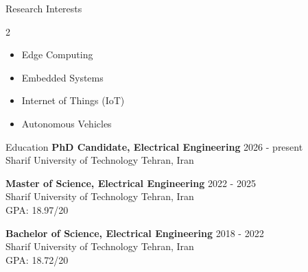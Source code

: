 \documentclass{resume} %
\begin{document}
\begin{rSection}{Research Interests}
\vspace*{-7pt}
\begin{multicols}{2}
\begin{itemize}
    \itemsep -3pt {} 
    \item Edge Computing
    \item Embedded Systems
    \item Internet of Things (IoT)
    \item Autonomous Vehicles
\end{itemize}
\end{multicols}
\vspace*{-12pt}
\end{rSection}

\begin{rSection}{Education}
{\bf PhD Candidate, Electrical Engineering} \hfill {2026 - present} \\
Sharif University of Technology \hfill {Tehran, Iran}

{\bf Master of Science, Electrical Engineering} \hfill {2022 - 2025} \\
Sharif University of Technology \hfill {Tehran, Iran} \\
GPA: 18.97/20

{\bf Bachelor of Science, Electrical Engineering} \hfill {2018 - 2022} \\
Sharif University of Technology \hfill {Tehran, Iran} \\
GPA: 18.72/20 
\end{rSection}
\end{document}
